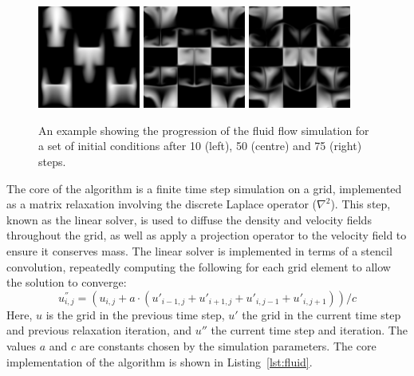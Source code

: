 \begin{figure}
    \begin{center}
        \includegraphics[width=0.3\textwidth]{images/sec-6/fluid/fluid-10}
        \includegraphics[width=0.3\textwidth]{images/sec-6/fluid/fluid-50}
        \includegraphics[width=0.3\textwidth]{images/sec-6/fluid/fluid-75}
    \end{center}
    \caption[Example of the fluid flow simulation]{An example showing the
        progression of the fluid flow simulation for a set of initial conditions
        after 10 (left), 50 (centre) and 75 (right) steps.}
    \label{fig:fluid_steps}
\end{figure}

The core of the algorithm is a finite time step simulation on a grid,
implemented as a matrix relaxation involving the discrete Laplace operator
($\nabla^2$). This step, known as the linear solver, is used to diffuse the
density and velocity fields throughout the grid, as well as apply a projection
operator to the velocity field to ensure it conserves mass. The linear solver is
implemented in terms of a stencil convolution, repeatedly computing the
following for each grid element to allow the solution to converge:
\[
u_{i,j}^{''} = \left( u_{i,j} + a \cdot \left( u'_{i-1,j}+u'_{i+1,j}+u'_{i,j-1}+u'_{i,j+1} \right) \right) / c
\]
Here, $u$ is the grid in the previous time step, $u'$ the grid in the current
time step and previous relaxation iteration, and $u''$ the current time step and
iteration. The values $a$ and $c$ are constants chosen by the simulation
parameters. The core implementation of the algorithm is shown in
Listing~\ref{lst:fluid}.

